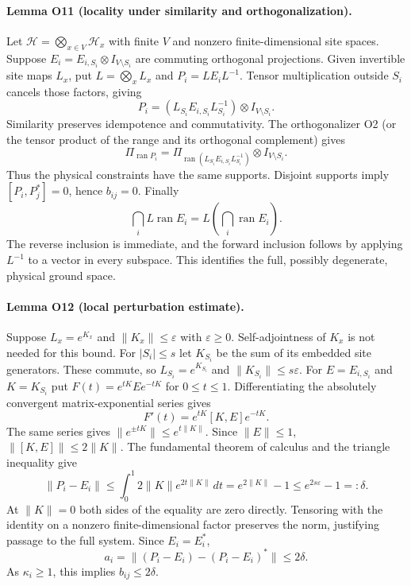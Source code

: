 \paragraph{Lemma O11 (locality under similarity and orthogonalization).}
Let $\mathcal H=\bigotimes_{x\in V}\mathcal H_x$ with finite $V$ and
nonzero finite-dimensional site spaces. Suppose
$E_i=E_{i,S_i}\otimes I_{V\setminus S_i}$ are commuting orthogonal
projections. Given invertible site maps $L_x$, put
$L=\bigotimes_xL_x$ and $P_i=LE_iL^{-1}$.
Tensor multiplication outside $S_i$ cancels those factors, giving
\[
 P_i=(L_{S_i}E_{i,S_i}L_{S_i}^{-1})\otimes I_{V\setminus S_i}.
\]
Similarity preserves idempotence and commutativity.
The orthogonalizer O2 (or the tensor product of the range and its
orthogonal complement) gives
\[
 \Pi_{\operatorname{ran}P_i}
 =\Pi_{\operatorname{ran}(L_{S_i}E_{i,S_i}L_{S_i}^{-1})}
 \otimes I_{V\setminus S_i}.
\]
Thus the physical constraints have the same supports.
Disjoint supports imply $[P_i,P_j^*]=0$, hence $b_{ij}=0$.
Finally
\[
 \bigcap_i L\operatorname{ran}E_i
 =L\left(\bigcap_i\operatorname{ran}E_i\right).
\]
The reverse inclusion is immediate, and the forward inclusion follows
by applying $L^{-1}$ to a vector in every subspace. This identifies the
full, possibly degenerate, physical ground space.

\paragraph{Lemma O12 (local perturbation estimate).}
Suppose $L_x=e^{K_x}$ and $\|K_x\|\leq\varepsilon$ with $\varepsilon\geq0$.
Self-adjointness of $K_x$ is not needed for this bound.
For $|S_i|\leq s$ let $K_{S_i}$ be the sum of its embedded site generators.
These commute, so $L_{S_i}=e^{K_{S_i}}$ and
$\|K_{S_i}\|\leq s\varepsilon$.
For $E=E_{i,S_i}$ and $K=K_{S_i}$ put
$F(t)=e^{tK}Ee^{-tK}$ for $0\leq t\leq1$.
Differentiating the absolutely convergent matrix-exponential series gives
\[
 F'(t)=e^{tK}[K,E]e^{-tK}.
\]
The same series gives $\|e^{\pm tK}\|\leq e^{t\|K\|}$.
Since $\|E\|\leq1$, $\|[K,E]\|\leq2\|K\|$.
The fundamental theorem of calculus and the triangle inequality give
\[
 \|P_i-E_i\|
 \leq\int_0^1 2\|K\|e^{2t\|K\|}\,dt
 =e^{2\|K\|}-1
 \leq e^{2s\varepsilon}-1=:\delta.
\]
At $\|K\|=0$ both sides of the equality are zero directly.
Tensoring with the identity on a nonzero finite-dimensional factor
preserves the norm, justifying passage to the full system.
Since $E_i=E_i^*$,
\[
 a_i=\|(P_i-E_i)-(P_i-E_i)^*\|\leq2\delta.
\]
As $\kappa_i\geq1$, this implies $b_{ij}\leq2\delta$.

